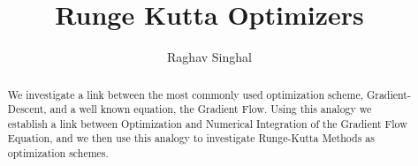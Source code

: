 \documentclass[12pt,twoside]{article}
\begin{document}
\title{Runge Kutta Optimizers}
\author{Raghav Singhal}
\maketitle

\begin{abstract}
We investigate a link between the most commonly used optimization
scheme, Gradient-Descent, and a well known equation, the Gradient
Flow. Using this analogy we establish a link between Optimization
and Numerical Integration of the Gradient Flow Equation, and we
then use this analogy to investigate Runge-Kutta Methods as
optimization schemes.
\end{abstract}








% 

% 




\end{document}
